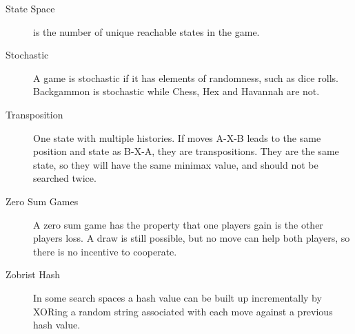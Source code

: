 \begin{description}
\item[State Space] is the number of unique reachable states in the game.
\item[Stochastic] A game is stochastic if it has elements of randomness, such as dice rolls. Backgammon is stochastic while Chess, Hex and Havannah are not.
\item[Transposition] One state with multiple histories. If moves A-X-B leads to the same position and state as B-X-A, they are transpositions. They are the same state, so they will have the same minimax value, and should not be searched twice.
\item[Zero Sum Games] A zero sum game has the property that one players gain is the other players loss. A draw is still possible, but no move can help both players, so there is no incentive to cooperate.
\item[Zobrist Hash] In some search spaces a hash value can be built up incrementally by XORing a random string associated with each move against a previous hash value.

\end{description}

